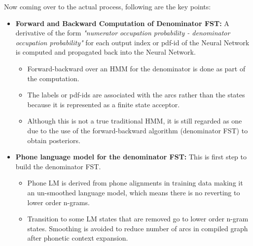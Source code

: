 Now coming over to the actual process, following are the key points: 
\begin{itemize}
    \item \textbf{Forward and Backward Computation of Denominator FST:} A derivative of the form \textit{"numerator occupation probability - denominator occupation probability"} for each output index or pdf-id of the Neural Network is computed and propagated back into the Neural Network. 
    \begin{itemize}
        \item Forward-backward over an HMM for the denominator is done as part of the computation. 
        \item The labels or pdf-ids are associated with the arcs rather than the states because it is represented as a finite state acceptor. 
        \item Although this is not a true traditional HMM, it is still regarded as one due to the use of the forward-backward algorithm (denominator FST) to obtain posteriors.
    \end{itemize}    
    \item \textbf{Phone language model for the denominator FST:} This is first step to build the denominator FST. 
    \begin{itemize}
        \item Phone LM is derived from phone alignments in training data making it an un-smoothed language model, which means there is no reverting to lower order n-grams. 
        \item Transition to some LM states that are removed go to lower order n-gram states. Smoothing is avoided to reduce number of arcs in compiled graph after phonetic context expansion.

\end{itemize}
\end{itemize}
